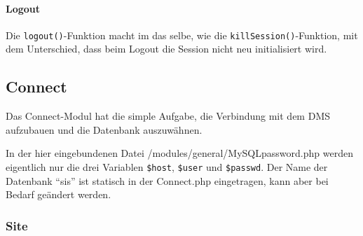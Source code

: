\paragraph{Logout\\}
Die \texttt{logout()}-Funktion macht im das selbe, wie die \texttt{killSession()}-Funktion, mit dem Unterschied, dass beim Logout die Session nicht neu initialisiert wird.


\subsection{Connect}
\label{sec:content_imple_base_connect}
Das Connect-Modul hat die simple Aufgabe, die Verbindung mit dem DMS aufzubauen und die Datenbank auszuwähnen.

In der hier eingebundenen Datei /modules/general/MySQLpassword.php werden eigentlich nur die drei Variablen \texttt{\$host}, \texttt{\$user} und \texttt{\$passwd}. Der Name der Datenbank \enquote{sis} ist statisch in der Connect.php eingetragen, kann aber bei Bedarf geändert werden.

\subsubsection{Site}


%
%
% 
%
